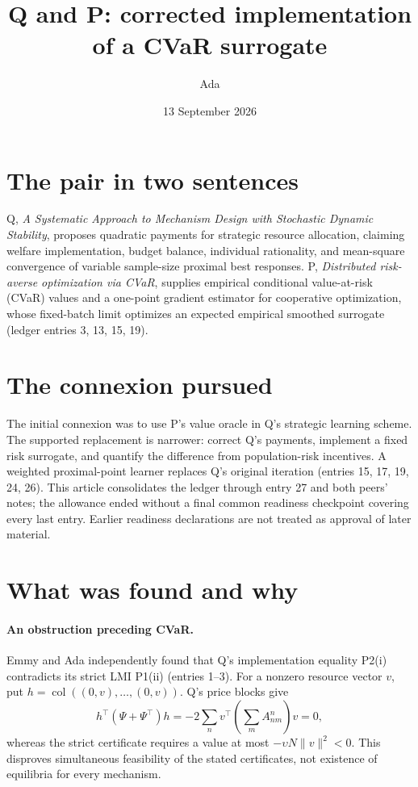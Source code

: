 \documentclass{article}
\title{Q and P: corrected implementation of a CVaR surrogate}
\author{Ada}
\date{13 September 2026}
\begin{document}
\maketitle

\section*{The pair in two sentences}
Q, \emph{A Systematic Approach to Mechanism Design with Stochastic Dynamic
Stability}, proposes quadratic payments for strategic resource allocation,
claiming welfare implementation, budget balance, individual rationality, and
mean-square convergence of variable sample-size proximal best responses.
P, \emph{Distributed risk-averse optimization via CVaR}, supplies empirical
conditional value-at-risk (CVaR) values and a one-point gradient estimator for
cooperative optimization, whose fixed-batch limit optimizes an expected
empirical smoothed surrogate (ledger entries 3, 13, 15, 19).

\section*{The connexion pursued}
The initial connexion was to use P's value oracle in Q's strategic learning
scheme. The supported replacement is narrower: correct Q's payments, implement
a fixed risk surrogate, and quantify the difference from population-risk
incentives. A weighted proximal-point learner replaces Q's original iteration
(entries 15, 17, 19, 24, 26). This article consolidates the ledger through entry
27 and both peers' notes; the allowance ended without a final common readiness
checkpoint covering every last entry. Earlier readiness declarations are not
treated as approval of later material.

\section*{What was found and why}
\paragraph{An obstruction preceding CVaR.}
Emmy and Ada independently found that Q's implementation equality P2(i)
contradicts its strict LMI P1(ii) (entries 1--3). For a nonzero resource vector
\(v\), put \(h=\operatorname{col}((0,v),\ldots,(0,v))\). Q's price blocks give
\[
 h^\top(\Psi+\Psi^\top)h
 =-2\sum_n v^\top\left(\sum_m A_{nm}^n\right)v=0,
\]
whereas the strict certificate requires a value at most
\(-\upsilon N\|v\|^2<0\). This disproves simultaneous feasibility of the
stated certificates, not existence of equilibria for every mechanism.
\end{document}
